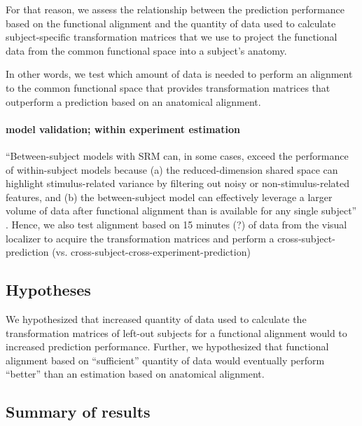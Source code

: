 For that reason, we assess the relationship between the prediction performance
based on the functional alignment and the quantity of data used to calculate
subject-specific transformation matrices that we use to project the functional
data from the common functional space into a subject's anatomy.

In other words, we test which amount of data is needed to perform an alignment
to the common functional space that provides transformation matrices that
outperform a prediction based on an anatomical alignment.


\paragraph{model validation; within experiment estimation}


%
``Between-subject models with SRM can, in some cases, exceed the performance of
within-subject models because (a) the reduced-dimension shared space can
highlight stimulus-related variance by filtering out noisy or
non-stimulus-related features, and (b) the between-subject model can effectively
leverage a larger volume of data after functional alignment than is available
for any single subject'' \citep{kumar2020brainiak}.
%
Hence, we also test alignment based on 15 minutes (?) of data from the visual
localizer to acquire the transformation matrices and perform a
cross-subject-prediction (vs. cross-subject-cross-experiment-prediction)


\subsection{Hypotheses}


%
We hypothesized that increased quantity of data used to calculate the
transformation matrices of left-out subjects for a functional alignment would to
increased prediction performance.
%
Further, we hypothesized that functional alignment based on ``sufficient''
quantity of data would eventually perform ``better'' than an estimation based on
anatomical alignment.


\subsection{Summary of results}

